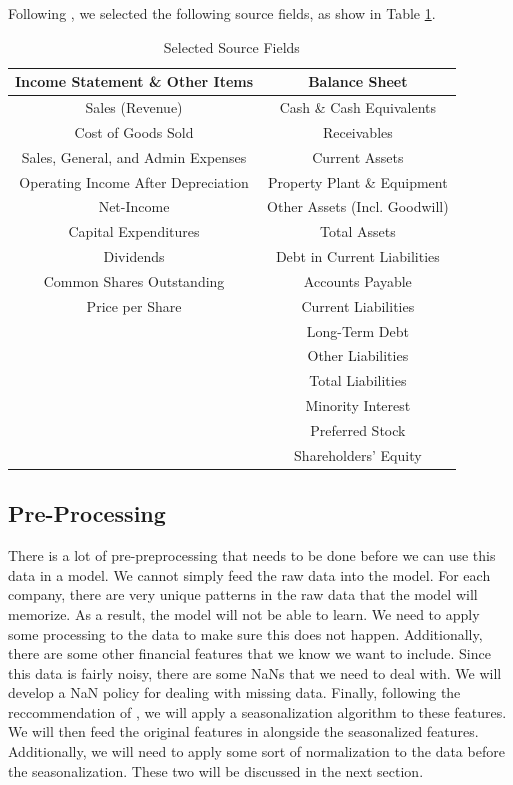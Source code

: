 \documentclass[AER]{AEA}
\begin{document}
Following \cite{euclidean}, we selected the following source fields, as show in Table \ref{tab:source_fields}.

\begin{table}[ht]
    \centering
    \begin{tabular}{|c|c|}
        \hline
        \textbf{Income Statement \& Other Items} & \textbf{Balance Sheet} \\
        \hline
        Sales (Revenue) & Cash \& Cash Equivalents \\
        Cost of Goods Sold & Receivables \\
        Sales, General, and Admin Expenses & Current Assets \\
        Operating Income After Depreciation & Property Plant \& Equipment \\
        Net-Income & Other Assets (Incl. Goodwill) \\
        Capital Expenditures & Total Assets \\
        Dividends & Debt in Current Liabilities \\
        Common Shares Outstanding & Accounts Payable \\
        Price per Share & Current Liabilities \\
        & Long-Term Debt \\
        & Other Liabilities \\
        & Total Liabilities \\
        & Minority Interest \\
        & Preferred Stock \\
        & Shareholders’ Equity \\
        \hline
    \end{tabular}
    \caption{Selected Source Fields}
    \label{tab:source_fields}
\end{table}
\subsection{Pre-Processing}
There is a lot of pre-preprocessing that needs to be done before we can use this data in a model. 
We cannot simply feed the raw data into the model. 
For each company, there are very unique patterns in the raw data that the model will memorize.
As a result, the model will not be able to learn. We need to apply some processing to the data to make sure
this does not happen. Additionally, there are some other financial features that we know we want to include.
Since this data is fairly noisy, there are some NaNs that we need to deal with. 
We will develop a NaN policy for dealing with missing data.
Finally, following the reccommendation of \cite{seasonalization}, we will apply a seasonalization algorithm to these features.
We will then feed the original features in alongside the seasonalized features.
Additionally, we will need to apply some sort of normalization to the data before the seasonalization. 
These two will be discussed in the next section.
\end{document}
